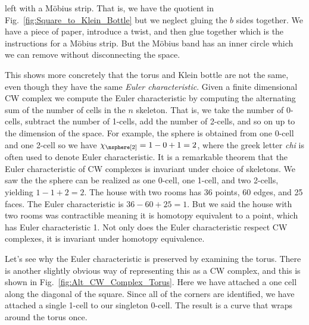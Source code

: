 \documentclass{book}                                                           %
\begin{document}
            left with a M\"{o}bius strip. That is, we have the quotient in
            Fig.~\ref{fig:Square_to_Klein_Bottle} but we neglect gluing the
            $b$ sides together. We have a piece of paper, introduce a twist, and
            then glue together which is the instructions for a M\"{o}bius strip.
            But the M\"{o}bius band has an inner circle which we can remove
            without disconnecting the space.
            \par\hfill\par
            This shows more concretely that the torus and Klein bottle are not
            the same, even though they have the same
            \textit{Euler characteristic}. Given a finite dimensional CW complex
            we compute the Euler characteristic by computing the alternating sum
            of the number of cells in the $n$ skeleton. That is, we take the
            number of 0-cells, subtract the number of 1-cells, add the number of
            2-cells, and so on up to the dimension of the space. For example,
            the sphere is obtained from one 0-cell and one 2-cell so we have
            $\chi_{\nsphere[2]}=1-0+1=2$, where the greek letter \textit{chi} is
            often used to denote Euler characteristic. It is a remarkable
            theorem that the Euler characteristic of CW complexes is invariant
            under choice of skeletons. We saw the the sphere can be realized as
            one 0-cell, one 1-cell, and two 2-cells, yielding $1-1+2=2$. The
            house with two rooms has 36 points, 60 edges, and 25 faces. The
            Euler characteristic is $36-60+25=1$. But we said the house with
            two rooms was contractible meaning it is homotopy equivalent to a
            point, which has Euler characteristic 1. Not only does the Euler
            characteristic respect CW complexes, it is invariant under homotopy
            equivalence.
            \par\hfill\par
            \begin{minipage}[t]{0.58\textwidth}
                Let's see why the Euler characteristic is preserved by
                examining the torus. There is another slightly obvious way of
                representing this as a CW complex, and this is shown in
                Fig.~\ref{fig:Alt_CW_Complex_Torus}. Here we have attached
                a one cell along the diagonal of the square. Since all of the
                corners are identified, we have attached a single 1-cell to our
                singleton 0-cell. The result is a curve that wraps around the
                torus once.
            \end{minipage}
\end{document}
